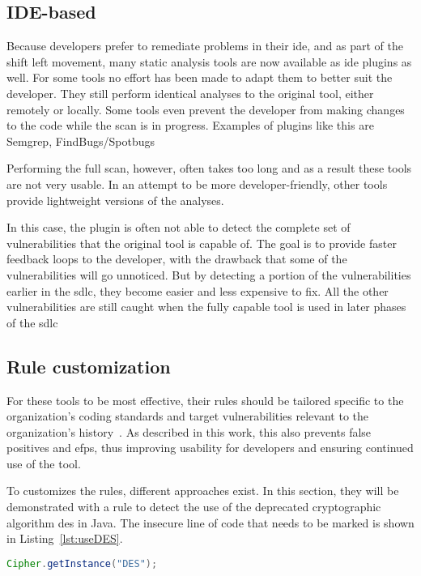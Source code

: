 \subsection{IDE-based}
Because developers prefer to remediate problems in their \gls{ide}, and as part of the shift left movement, many static analysis tools are now available as \gls{ide} plugins as well.
For some tools no effort has been made to adapt them to better suit the developer.
They still perform identical analyses to the original tool, either remotely or locally.
Some tools even prevent the developer from making changes to the code while the scan is in progress.
Examples of plugins like this are Semgrep, FindBugs/Spotbugs

Performing the full scan, however, often takes too long and as a result these tools are not very usable.
In an attempt to be more developer-friendly, other tools provide lightweight versions of the analyses.

In this case, the plugin is often not able to detect the complete set of vulnerabilities that the original tool is capable of.
The goal is to provide faster feedback loops to the developer, with the drawback that some of the vulnerabilities will go unnoticed.
But by detecting a portion of the vulnerabilities earlier in the \gls{sdlc}, they become easier and less expensive to fix.
All the other vulnerabilities are still caught when the fully capable tool is used in later phases of the \gls{sdlc}

\subsection{Rule customization}
\label{sec:customization}
For these tools to be most effective, their rules should be tailored specific to the organization's coding standards and target vulnerabilities relevant to the organization's history~\cite{bsimm9,bsimm11}.
As described in this work, this also prevents false positives and \glspl{efp}, thus improving usability for developers and ensuring continued use of the tool.

To customizes the rules, different approaches exist.
In this section, they will be demonstrated with a rule to detect the use of the deprecated cryptographic algorithm \gls{des} in Java.
The insecure line of code that needs to be marked is shown in Listing~\ref{lst:useDES}.

\begin{lstlisting}[language={Java},caption={Insecure use of a deprecated cryptographic algorithm},label={lst:useDES},abovecaptionskip=-0.0pt,xleftmargin=15pt]
Cipher.getInstance("DES");
\end{lstlisting}

